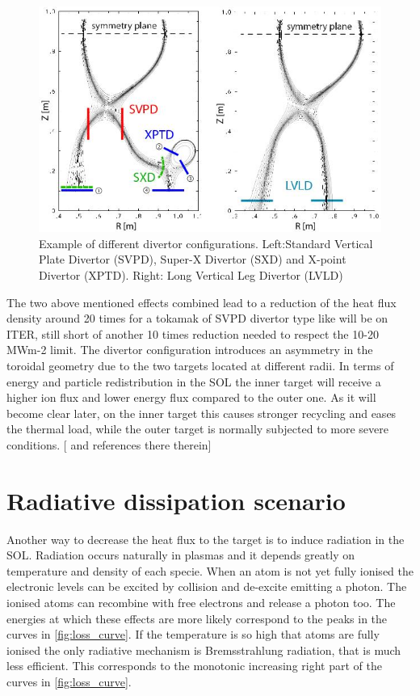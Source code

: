 \begin{figure}
	\centering
	\includegraphics[width=\linewidth]{Chapters/chapter1/figs/divertor geometry.jpg}
	\caption{Example of different divertor configurations. Left:Standard Vertical Plate Divertor (SVPD), Super-X Divertor (SXD) and X-point Divertor (XPTD). Right: Long Vertical Leg Divertor (LVLD) \cite{Umansky2017}}
	\label{fig:divertor_geometry}
\end{figure}

The two above mentioned effects combined lead to a reduction of the heat flux density around 20 times for a tokamak of SVPD divertor type like will be on ITER, still short of another 10 times reduction needed to respect the 10-20 MWm-2 limit. The divertor configuration introduces an asymmetry in the toroidal geometry due to the two targets located at different radii. In terms of energy and particle redistribution in the SOL the inner target will receive a higher ion flux and lower energy flux compared to the outer one. As it will become clear later, on the inner target this causes stronger recycling and eases the thermal load, while the outer target is normally subjected to more severe conditions. [\cite{Potzel2014} and references there therein]

\section{Radiative dissipation scenario}

Another way to decrease the heat flux to the target is to induce radiation in the SOL.
Radiation occurs naturally in plasmas and it depends greatly on temperature and density of each specie. When an atom is not yet fully ionised the electronic levels can be excited by collision and de-excite emitting a photon. The ionised atoms can recombine with free electrons and release a photon too. The energies at which these effects are more likely correspond to the peaks in the curves in \autoref{fig:loss_curve}. If the temperature is so high that atoms are fully ionised the only radiative mechanism is Bremsstrahlung radiation, that is much less efficient. This corresponds to the monotonic increasing right part of the curves in \autoref{fig:loss_curve}.

